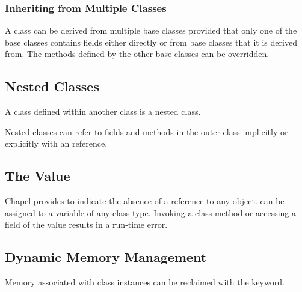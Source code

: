 \subsubsection{Inheriting from Multiple Classes}
\label{Inheriting_from_Multiple_Classes}

A class can be derived from multiple base classes provided that only
one of the base classes contains fields either directly or from base
classes that it is derived from.  The methods defined by the other
base classes can be overridden.

\subsection{Nested Classes}
\label{Nested_Classes}

A class defined within another class is a nested class.

Nested classes can refer to fields and methods in the outer class
implicitly or explicitly with an  reference.

\subsection{The  Value}

Chapel provides  to indicate the absence of a reference to
any object.   can be assigned to a variable of any class
type.  Invoking a class method or accessing a field of the 
value results in a run-time error.

\subsection{Dynamic Memory Management}
\label{Dynamic_Memory_Management}
\label{Class_Delete}

Memory associated with class instances can be reclaimed with the 
keyword.


